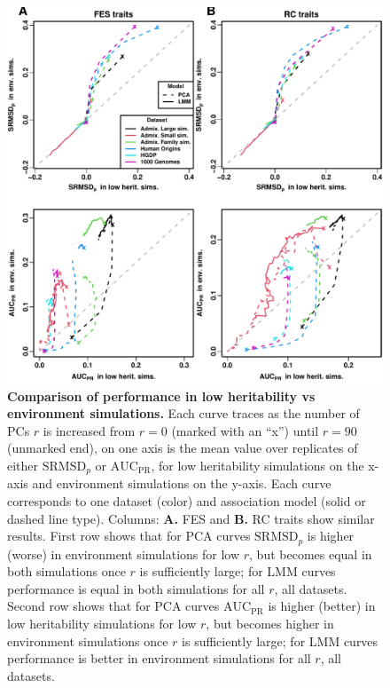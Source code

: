 \documentclass[11pt]{article}
\newcommand{\rmsd}{\text{SRMSD}_p}
\newcommand{\auc}{\text{AUC}_\text{PR}}
\begin{document}
\begin{figure}[hp!]
  \centering
  \includegraphics[width=\textwidth,height=0.7\textheight,keepaspectratio]{low-herit-vs-env.pdf}
  \caption{
    {\bf Comparison of performance in low heritability vs environment simulations.}
    Each curve traces as the number of PCs $r$ is increased from $r=0$ (marked with an ``x'') until $r=90$ (unmarked end), on one axis is the mean value over replicates of either $\rmsd$ or $\auc$, for low heritability simulations on the x-axis and environment simulations on the y-axis.
    Each curve corresponds to one dataset (color) and association model (solid or dashed line type).
    Columns: \textbf{A.} FES and \textbf{B.} RC traits show similar results.
    First row shows that for PCA curves $\rmsd$ is higher (worse) in environment simulations for low $r$, but becomes equal in both simulations once $r$ is sufficiently large; for LMM curves performance is equal in both simulations for all $r$, all datasets.
    Second row shows that for PCA curves $\auc$ is higher (better) in low heritability simulations for low $r$, but becomes higher in environment simulations once $r$ is sufficiently large; for LMM curves performance is better in environment simulations for all $r$, all datasets.
  }
  \label{fig:low-herit-vs-env}
\end{figure}
\end{document}
